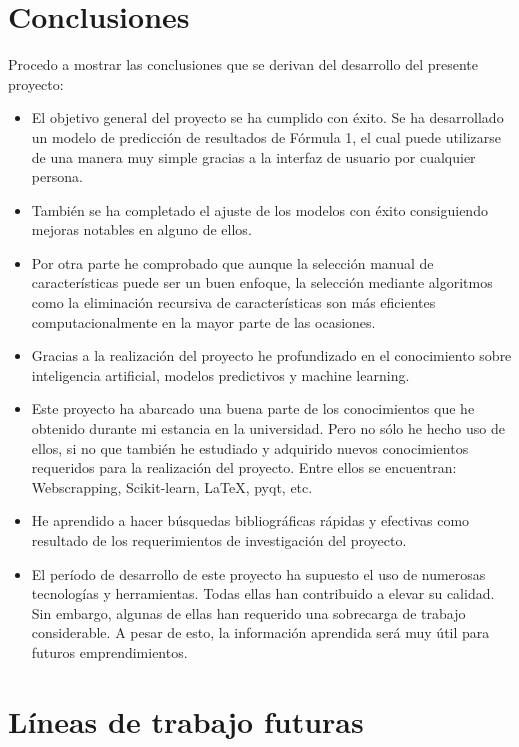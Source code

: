 
\section{Conclusiones}

Procedo a mostrar las conclusiones que se derivan del desarrollo del presente proyecto:

\begin{itemize}
\tightlist
\item
  El objetivo general del proyecto se ha cumplido con éxito. Se ha desarrollado un modelo de predicción de resultados de Fórmula 1, el cual puede utilizarse de una manera muy simple gracias a la interfaz de usuario por cualquier persona.
\item
  También se ha completado el ajuste de los modelos con éxito consiguiendo mejoras notables en alguno de ellos.
\item
  Por otra parte he comprobado que aunque la selección manual de características puede ser un buen enfoque, la selección mediante algoritmos como la eliminación recursiva de características son más eficientes computacionalmente en la mayor parte de las ocasiones.
\item
  Gracias a la realización del proyecto he profundizado en el conocimiento sobre inteligencia artificial, modelos predictivos y machine learning.
\item
  Este proyecto ha abarcado una buena parte de los conocimientos que he obtenido durante mi estancia en la universidad. Pero no sólo he hecho uso de ellos, si no que también he estudiado y adquirido nuevos conocimientos requeridos para la realización del proyecto. Entre ellos se encuentran: Webscrapping, Scikit-learn, \LaTeX, pyqt, etc.
\item
  He aprendido a hacer búsquedas bibliográficas rápidas y efectivas como resultado de los requerimientos de investigación del proyecto.
\item
  El período de desarrollo de este proyecto ha supuesto el uso de numerosas tecnologías y herramientas. Todas ellas han contribuido a elevar su calidad. Sin embargo, algunas de ellas han requerido una sobrecarga de trabajo considerable. A pesar de esto, la información aprendida será muy útil para futuros emprendimientos.

\end{itemize}

\section{Líneas de trabajo futuras}

